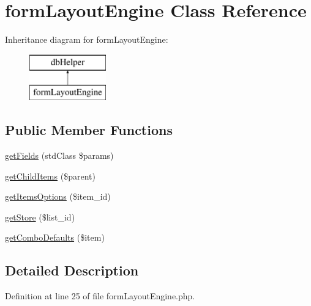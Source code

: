 \hypertarget{classform_layout_engine}{\section{form\-Layout\-Engine \-Class \-Reference}
\label{classform_layout_engine}
}
\-Inheritance diagram for form\-Layout\-Engine\-:\begin{figure}[H]
\begin{center}
\leavevmode
\includegraphics[height=2.000000cm]{classform_layout_engine}
\end{center}
\end{figure}
\subsection*{\-Public \-Member \-Functions}
\begin{DoxyCompactItemize}
\item 
\hyperlink{classform_layout_engine_aac0ec25d9ed7255a0d2e2ad1174d324b}{get\-Fields} (std\-Class \$params)
\item 
\hyperlink{classform_layout_engine_a25eb9dec9c7fa7132bc97c113aae2bfe}{get\-Child\-Items} (\$parent)
\item 
\hyperlink{classform_layout_engine_a89955ff647a3d7183e3468bac90f90a0}{get\-Items\-Options} (\$item\-\_\-id)
\item 
\hyperlink{classform_layout_engine_a5b15a478954309f198a8435ce45e1997}{get\-Store} (\$list\-\_\-id)
\item 
\hyperlink{classform_layout_engine_a8ac8fd2609c4b0bc23b1deaa36c2a43f}{get\-Combo\-Defaults} (\$item)
\end{DoxyCompactItemize}


\subsection{\-Detailed \-Description}


\-Definition at line 25 of file form\-Layout\-Engine.\-php.




